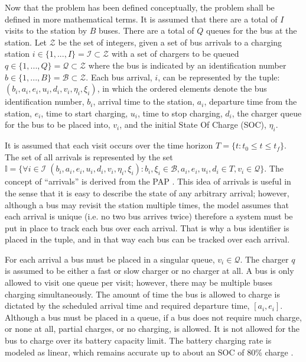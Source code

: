 \documentclass[ee,msthesis]{usuthesis}
\newcommand{\visit}{(b_i, a_i, e_i, u_i, d_i, v_i, \eta_i, \xi_i)}
\newcommand{\I}{\mathbb{I}}                 %
\newcommand{\Iset}{\mathcal{I}}             %
\newcommand{\Bset}{\mathcal{B}}             %
\newcommand{\Qset}{\mathcal{Q}}             %
\begin{document}
Now that the problem has been defined conceptually, the problem shall be defined in more mathematical terms.
It is assumed that there are a total of \(I\) visits to the station by \(B\) buses. There are a total of \(Q\) queues for the
bus at the station. Let \(\mathcal{Z}\) be the set of integers, given a set of bus arrivals to a charging station \(i \in \{1,..., I\}
= \Iset \subset \mathcal{Z}\) with a set of chargers to be queued \(q \in \{1,..., Q\} = \Qset \subset \mathcal{Z}\) where the bus is indicated by an
identification number \(b \in \{1,..., B\} = \Bset \subset \mathcal{Z}\). Each bus arrival, \(i\), can be represented by the tuple: \(\visit\),
in which the ordered elements denote the bus identification number, \(b_i\), arrival time to the station, \(a_i\), departure
time from the station, \(e_i\), time to start charging, \(u_i\), time to stop charging, \(d_i\), the charger queue for the bus
to be placed into, \(v_i\), and the initial State Of Charge (SOC), \(\eta_i\).

It is assumed that each visit occurs over the time horizon \(T = \{t : t_0 \le t \le t_f \}\). The set of all arrivals is
represented by the set \(\I = \{\forall i \in \Iset \; \visit: b_i, \xi_i \in \Bset, a_i, e_i, u_i, d_i \in T, v_i \in \Qset \}\). The
concept of ``arrivals'' is derived from the PAP \cite{qarebagh-2019-optim-sched}. This idea of arrivals is useful in the
sense that it is easy to describe the state of any arbitrary arrival; however, although a bus may revisit the station
multiple times, the model assumes that each arrival is unique (i.e. no two bus arrives twice) therefore a system must be
put in place to track each bus over each arrival. That is why a bus identifier is placed in the tuple, and in that way
each bus can be tracked over each arrival.

For each arrival a bus must be placed in a singular queue, \(v_i \in \Qset\). The charger \(q\) is assumed to be either a fast
or slow charger or no charger at all. A bus is only allowed to visit one queue per visit; however, there may be multiple
buses charging simultaneously. The amount of time the bus is allowed to charge is dictated by the scheduled arrival time
and required departure time, \([a_i, e_i]\). Although a bus must be placed in a queue, if a bus does not require much
charge, or none at all, partial charges, or no charging, is allowed. It is not allowed for the bus to charge over its
battery capacity limit. The battery charging rate is modeled as linear, which remains accurate up to about an SOC of 80\%
charge \cite{li-2016-batter-elect}.
\end{document}
